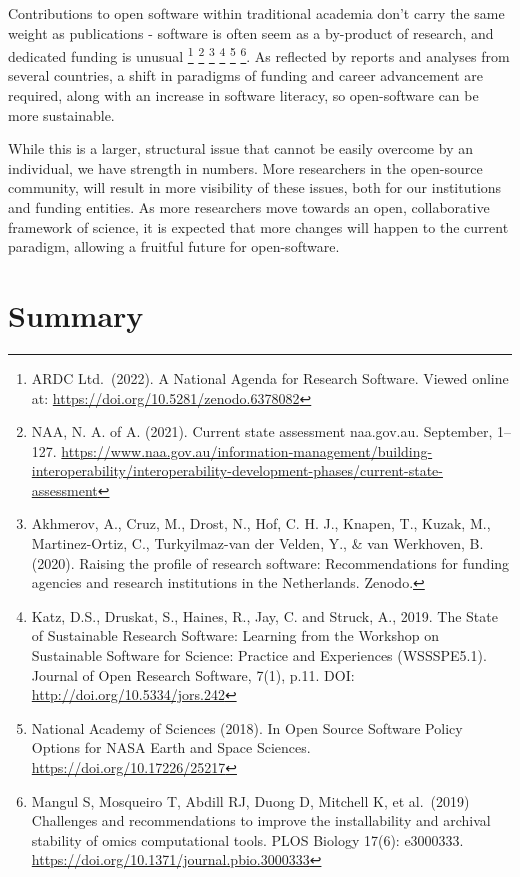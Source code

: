 \documentclass[
  letterpaper,
  DIV=11,
  numbers=noendperiod]{scrreport}
\begin{document}
Contributions to open software within traditional academia don't carry
the same weight as publications - software is often seem as a by-product
of research, and dedicated funding is unusual \footnote{ARDC
  Ltd.~(2022). A National Agenda for Research Software. Viewed online
  at: \url{https://doi.org/10.5281/zenodo.6378082}} \footnote{NAA, N. A.
  of A. (2021). Current state assessment \textbar{} naa.gov.au.
  September, 1--127.
  \url{https://www.naa.gov.au/information-management/building-interoperability/interoperability-development-phases/current-state-assessment}}
\footnote{Akhmerov, A., Cruz, M., Drost, N., Hof, C. H. J., Knapen, T.,
  Kuzak, M., Martinez-Ortiz, C., Turkyilmaz-van der Velden, Y., \& van
  Werkhoven, B. (2020). Raising the profile of research software:
  Recommendations for funding agencies and research institutions in the
  Netherlands. Zenodo.} \footnote{Katz, D.S., Druskat, S., Haines, R.,
  Jay, C. and Struck, A., 2019. The State of Sustainable Research
  Software: Learning from the Workshop on Sustainable Software for
  Science: Practice and Experiences (WSSSPE5.1). Journal of Open
  Research Software, 7(1), p.11. DOI:
  \url{http://doi.org/10.5334/jors.242}} \footnote{National Academy of
  Sciences (2018). In Open Source Software Policy Options for NASA Earth
  and Space Sciences. \url{https://doi.org/10.17226/25217}} \footnote{Mangul
  S, Mosqueiro T, Abdill RJ, Duong D, Mitchell K, et al.~(2019)
  Challenges and recommendations to improve the installability and
  archival stability of omics computational tools. PLOS Biology 17(6):
  e3000333. \url{https://doi.org/10.1371/journal.pbio.3000333}}. As
reflected by reports and analyses from several countries, a shift in
paradigms of funding and career advancement are required, along with an
increase in software literacy, so open-software can be more sustainable.

While this is a larger, structural issue that cannot be easily overcome
by an individual, we have strength in numbers. More researchers in the
open-source community, will result in more visibility of these issues,
both for our institutions and funding entities. As more researchers move
towards an open, collaborative framework of science, it is expected that
more changes will happen to the current paradigm, allowing a fruitful
future for open-software.

\hypertarget{summary-4}{%
\section{Summary}\label{summary-4}}
\end{document}
